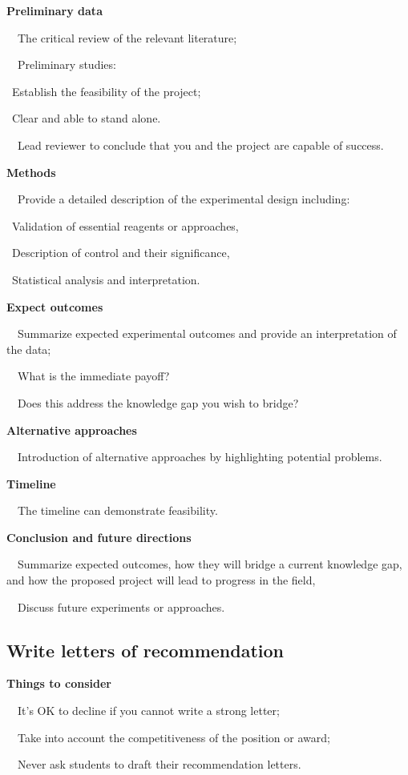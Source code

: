 \documentclass[a4paper, 12pt]{article}
\begin{document}
\textbf{Preliminary data}
\par\ \textbullet\ The critical review of the relevant literature;
\par\ \textbullet\ Preliminary studies:
\par\quad\textopenbullet\ Establish the feasibility of the project;
\par\quad\textopenbullet\ Clear and able to stand alone.
\par\ \textbullet\ Lead reviewer to conclude that you and the project are capable of success.

\textbf{Methods}
\par\ \textbullet\ Provide a detailed description of the experimental design including:
\par\quad\textopenbullet\ Validation of essential reagents or approaches,
\par\quad\textopenbullet\ Description of control and their significance,
\par\quad\textopenbullet\ Statistical analysis and interpretation.

\newpage\textbf{Expect outcomes}
\par\ \textbullet\ Summarize expected experimental outcomes and provide an interpretation of the data;
\par\ \textbullet\ What is the immediate payoff?
\par\ \textbullet\ Does this address the knowledge gap you wish to bridge?

\textbf{Alternative approaches}
\par\ \textbullet\ Introduction of alternative approaches by highlighting potential problems.

\textbf{Timeline}
\par\ \textbullet\ The timeline can demonstrate feasibility.

\textbf{Conclusion and future directions}
\par\ \textbullet\ Summarize expected outcomes, how they will bridge a current knowledge gap, and how the proposed project will lead to progress in the field,
\par\ \textbullet\ Discuss future experiments or approaches.

\newpage\subsection{Write letters of recommendation}

\textbf{Things to consider}
\par\ \textbullet\ It's OK to decline if you cannot write a strong letter;
\par\ \textbullet\ Take into account the competitiveness of the position or award;
\par\ \textbullet\ Never ask students to draft their recommendation letters.
\end{document}
